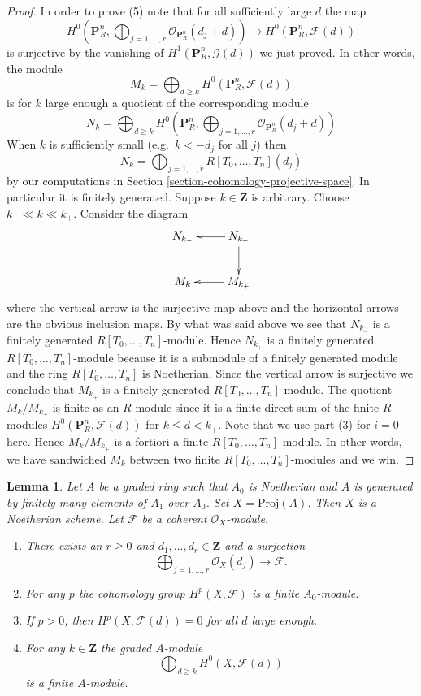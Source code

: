 \documentclass{stacks-project}
\theoremstyle{plain}
\newtheorem{lemma}[subsection]{Lemma}
\theoremstyle{definition}
\theoremstyle{remark}
\numberwithin{equation}{subsection}
\begin{document}
\begin{proof}
\medskip\noindent
In order to prove (5) note that for all sufficiently large $d$
the map
$$
H^0(\mathbf{P}^n_R, \bigoplus\nolimits_{j = 1, \ldots, r}
\mathcal{O}_{\mathbf{P}^n_R}(d_j + d))
\to
H^0(\mathbf{P}^n_R, \mathcal{F}(d))
$$
is surjective by the vanishing of $H^1(\mathbf{P}^n_R, \mathcal{G}(d))$
we just proved. In other words, the module
$$
M_k
=
\bigoplus\nolimits_{d \geq k} H^0(\mathbf{P}^n_R, \mathcal{F}(d))
$$
is for $k$ large enough a quotient of the corresponding module
$$
N_k
=
\bigoplus\nolimits_{d \geq k} H^0(\mathbf{P}^n_R,
\bigoplus\nolimits_{j = 1, \ldots, r}
\mathcal{O}_{\mathbf{P}^n_R}(d_j + d)
)
$$
When $k$ is sufficiently small (e.g.\ $k < -d_j$ for all $j$) then
$$
N_k = \bigoplus\nolimits_{j = 1, \ldots, r}
R[T_0, \ldots, T_n](d_j)
$$
by our computations in Section \ref{section-cohomology-projective-space}.
In particular it is finitely generated.
Suppose $k \in \mathbf{Z}$ is arbitrary.
Choose $k_{-} \ll k \ll k_{+}$.
Consider the diagram
$$
\xymatrix{
N_{k_{-}} & N_{k_{+}} \ar[d] \ar[l] \\
M_k & M_{k_{+}} \ar[l]
}
$$
where the vertical arrow is the surjective map above and
the horizontal arrows are the obvious inclusion maps.
By what was said above we see that $N_{k_{-}}$ is a finitely
generated $R[T_0, \ldots, T_n]$-module. Hence $N_{k_{+}}$ is
a finitely generated $R[T_0, \ldots, T_n]$-module because it
is a submodule of a finitely generated module and the ring
$R[T_0, \ldots, T_n]$ is Noetherian. Since the vertical arrow
is surjective we conclude that $M_{k_{+}}$ is a finitely
generated $R[T_0, \ldots, T_n]$-module. The quotient
$M_k/M_{k_{+}}$ is finite as an $R$-module since it is a
finite direct sum of the finite $R$-modules
$H^0(\mathbf{P}^n_R, \mathcal{F}(d))$ for $k \leq d < k_{+}$.
Note that we use part (3) for $i = 0$ here. Hence
$M_k/M_{k_{+}}$ is a fortiori a finite $R[T_0, \ldots, T_n]$-module.
In other words, we have sandwiched $M_k$ between two finite
$R[T_0, \ldots, T_n]$-modules and we win.
\end{proof}

\begin{lemma}
\label{lemma-coherent-on-proj}
Let $A$ be a graded ring such that $A_0$ is Noetherian and
$A$ is generated by finitely many elements of $A_1$ over $A_0$.
Set $X = \text{Proj}(A)$. Then $X$ is a Noetherian scheme.
Let $\mathcal{F}$ be a coherent $\mathcal{O}_X$-module.
\begin{enumerate}
\item There exists an $r \geq 0$ and
$d_1, \ldots, d_r \in \mathbf{Z}$ and a surjection
$$
\bigoplus\nolimits_{j = 1, \ldots, r} \mathcal{O}_X(d_j)
\longrightarrow \mathcal{F}.
$$
\item For any $p$ the cohomology group $H^p(X, \mathcal{F})$ is a finite
$A_0$-module.
\item If $p > 0$, then $H^p(X, \mathcal{F}(d)) = 0$ for all $d$ large enough.
\item For any $k \in \mathbf{Z}$ the graded $A$-module
$$
\bigoplus\nolimits_{d \geq k} H^0(X, \mathcal{F}(d))
$$
is a finite $A$-module.
\end{enumerate}
\end{lemma}
\end{document}
